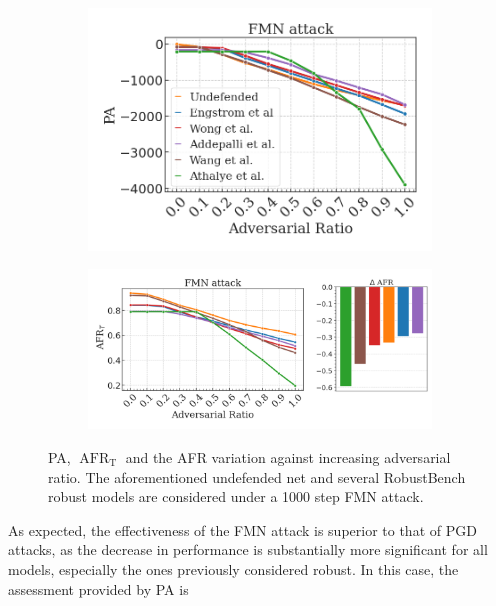 \begin{figure}[H]
    \centering
    \begin{subfigure}[b]{0.39\textwidth}
        \centering
        \includegraphics[width=\textwidth]{img/results_discussion/adversarial/FMN_logPA.png}
    \end{subfigure}
    \hfill
    \begin{subfigure}[b]{0.59\textwidth}
        \centering
        \includegraphics[width=\textwidth]{img/results_discussion/adversarial/FMN_1000_AFR_true.png}
    \end{subfigure}
    \caption{PA, $\operatorname{AFR}_\text{T}$ and the AFR variation against increasing adversarial ratio. 
    The aforementioned undefended net and several RobustBench robust models are considered 
    under a 1000 step FMN attack.}
    \label{fig:adv_fmn_pa_afr}
\end{figure}


As expected, the effectiveness of the FMN attack is superior to that of PGD attacks, as
the decrease in performance is substantially more significant for all models, especially the ones
previously considered robust. In this case, the assessment provided by PA is 

